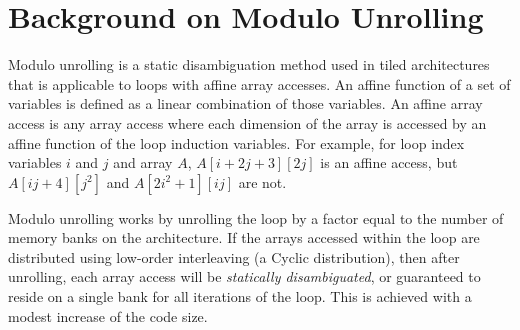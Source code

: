 
\renewcommand{\thechapter}{4}

\chapter{Background on Modulo Unrolling}\label{sec:modulo_unrolling}


Modulo unrolling \cite{barua1999maps} is a static disambiguation method used in tiled architectures that is applicable to loops with affine array accesses. An affine function of a set of variables is defined as a linear combination of those variables. An affine array access is any array access where each dimension of the array is accessed by an affine function of the loop induction variables. For example, for loop index variables $i$ and $j$ and array $A$, $A[i+2j+3][2j]$ is an affine access, but $A[ij+4][j^2]$ and $A[2i^2+1][ij]$ are not. 

Modulo unrolling works by unrolling the loop by a factor equal to the number of memory banks on the architecture. If the arrays accessed within the loop are distributed using low-order interleaving (a Cyclic distribution), then after unrolling, each array access will be \textit{statically disambiguated}, or guaranteed to reside on a single bank for all iterations of the loop. This is achieved with a modest increase of the code size. 

